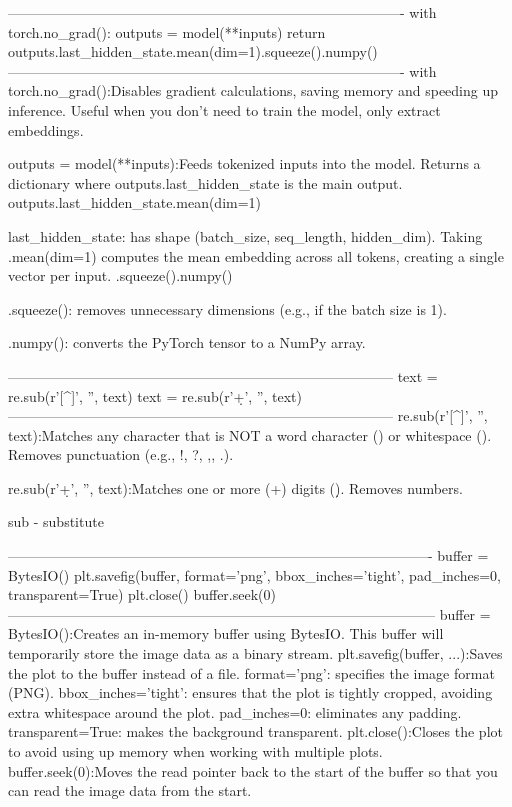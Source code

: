 -------------------------------------------------------------------------------------
 with torch.no_grad():
        outputs = model(**inputs)
    return outputs.last_hidden_state.mean(dim=1).squeeze().numpy()
-------------------------------------------------------------------------------------
with torch.no_grad():Disables gradient calculations, saving memory and speeding up inference.
Useful when you don't need to train the model, only extract embeddings.

outputs = model(**inputs):Feeds tokenized inputs into the model.
Returns a dictionary where outputs.last_hidden_state is the main output.
outputs.last_hidden_state.mean(dim=1)

last_hidden_state: has shape (batch_size, seq_length, hidden_dim).
Taking .mean(dim=1) computes the mean embedding across all tokens, creating a single vector per input.
.squeeze().numpy()

.squeeze(): removes unnecessary dimensions (e.g., if the batch size is 1).

.numpy(): converts the PyTorch tensor to a NumPy array.

-----------------------------------------------------------------------------------
text = re.sub(r'[^\w\s]', '', text)
text = re.sub(r'\d+', '', text)
-----------------------------------------------------------------------------------
re.sub(r'[^\w\s]', '', text):Matches any character that is NOT a word character (\w) or whitespace (\s).
Removes punctuation (e.g., !, ?, ,, .).

re.sub(r'\d+', '', text):Matches one or more (+) digits (\d).
Removes numbers.

sub - substitute

-------------------------------------------------------------------------------------------
buffer = BytesIO()
plt.savefig(buffer, format='png', bbox_inches='tight', pad_inches=0, transparent=True)
plt.close()
buffer.seek(0)
--------------------------------------------------------------------------------------------
buffer = BytesIO():Creates an in-memory buffer using BytesIO. This buffer will temporarily store the image data as a binary stream.
plt.savefig(buffer, ...):Saves the plot to the buffer instead of a file.
format='png': specifies the image format (PNG).
bbox_inches='tight': ensures that the plot is tightly cropped, avoiding extra whitespace around the plot.
pad_inches=0: eliminates any padding.
transparent=True: makes the background transparent.
plt.close():Closes the plot to avoid using up memory when working with multiple plots.
buffer.seek(0):Moves the read pointer back to the start of the buffer so that you can read the image data from the start.
     
